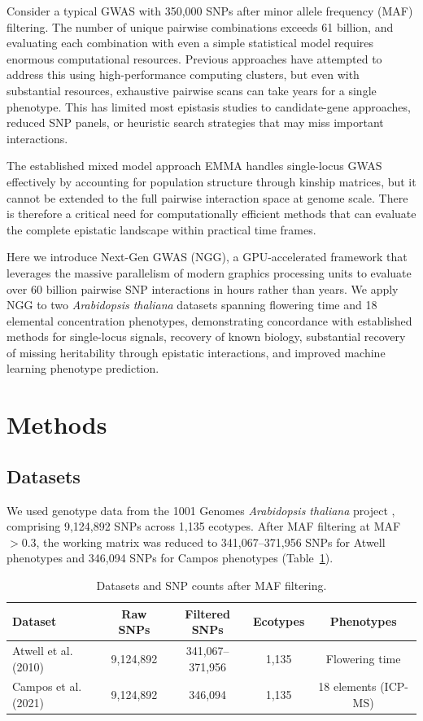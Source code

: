 \documentclass[11pt]{article}
\begin{document}
Consider a typical GWAS with 350,000 SNPs after minor allele frequency (MAF) filtering. The number of unique pairwise combinations exceeds 61 billion, and evaluating each combination with even a simple statistical model requires enormous computational resources. Previous approaches have attempted to address this using high-performance computing clusters, but even with substantial resources, exhaustive pairwise scans can take years for a single phenotype. This has limited most epistasis studies to candidate-gene approaches, reduced SNP panels, or heuristic search strategies that may miss important interactions.

The established mixed model approach EMMA \citep{kang2008} handles single-locus GWAS effectively by accounting for population structure through kinship matrices, but it cannot be extended to the full pairwise interaction space at genome scale. There is therefore a critical need for computationally efficient methods that can evaluate the complete epistatic landscape within practical time frames.

Here we introduce Next-Gen GWAS (NGG), a GPU-accelerated framework that leverages the massive parallelism of modern graphics processing units to evaluate over 60 billion pairwise SNP interactions in hours rather than years. We apply NGG to two \textit{Arabidopsis thaliana} datasets \citep{atwell2010, campos2021} spanning flowering time and 18 elemental concentration phenotypes, demonstrating concordance with established methods for single-locus signals, recovery of known biology, substantial recovery of missing heritability through epistatic interactions, and improved machine learning phenotype prediction.

\section{Methods}

\subsection{Datasets}

We used genotype data from the 1001 Genomes \textit{Arabidopsis thaliana} project \citep{oneill2019}, comprising 9,124,892 SNPs across 1,135 ecotypes. After MAF filtering at MAF $> 0.3$, the working matrix was reduced to 341,067--371,956 SNPs for Atwell phenotypes and 346,094 SNPs for Campos phenotypes (Table~\ref{tab:datasets}).

\begin{table}[htbp]
\centering
\caption{Datasets and SNP counts after MAF filtering.}
\label{tab:datasets}
\begin{tabular}{lcccc}
\toprule
Dataset & Raw SNPs & Filtered SNPs & Ecotypes & Phenotypes \\
\midrule
Atwell et al. (2010) & 9,124,892 & 341,067--371,956 & 1,135 & Flowering time \\
Campos et al. (2021) & 9,124,892 & 346,094 & 1,135 & 18 elements (ICP-MS) \\
\bottomrule
\end{tabular}
\end{table}
\end{document}
